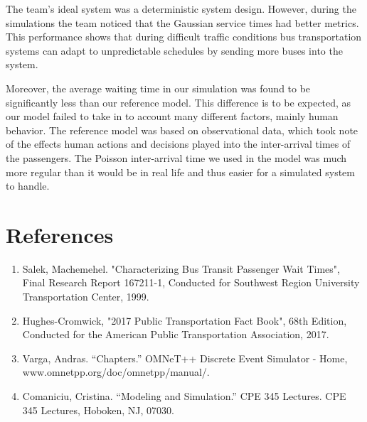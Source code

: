 \documentclass{article}
\begin{document}
The team’s ideal system was a deterministic system design. However, during the simulations the team noticed that the Gaussian service times had better metrics. This performance shows that during difficult traffic conditions bus transportation systems can adapt to unpredictable schedules by sending more buses into the system.

Moreover, the average waiting time in our simulation was found to be significantly less than our reference model. This difference is to be expected, as our model failed to take in to account many different factors, mainly human behavior. The reference model was based on observational data, which took note of the effects human actions and decisions played into the inter-arrival times of the passengers. The Poisson inter-arrival time we used in the model was much more regular than it would be in real life and thus easier for a simulated system to handle. 



\section{References}
\begin{enumerate}
\item Salek, Machemehel. "Characterizing Bus Transit Passenger Wait Times", Final Research Report 167211-1, Conducted for Southwest Region University Transportation Center, 1999.
\item Hughes-Cromwick, "2017 Public Transportation Fact Book", 68th Edition, Conducted for the American Public Transportation Association, 2017.
\item Varga, Andras. “Chapters.” OMNeT++ Discrete Event Simulator - Home, www.omnetpp.org/doc/omnetpp/manual/.
\item Comaniciu, Cristina. “Modeling and Simulation.” CPE 345 Lectures. CPE 345 Lectures, Hoboken, NJ, 07030.
\end{enumerate}
\end{document}
